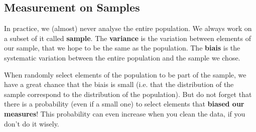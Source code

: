 \documentclass[a4paper,11pt,twoside]{article}
\begin{document}
\subsection{Measurement on Samples}

In practice, we (almost) never analyse the entire population. We always work on a subset of it called \textbf{sample}. The \textbf{variance} is the variation between elements of our sample, that we hope to be the same as the population. The \textbf{biais} is the systematic variation between the entire population and the sample we chose.

When randomly select elements of the population to be part of the sample, we have a great chance that the biais is small (i.e. that the distribution of the sample correspond to the distribution of the population). But do not forget that there is a probability (even if a small one) to select elements that \textbf{biased our measures}! This probability can even increase when you clean the data, if you don't do it wisely.
\end{document}
